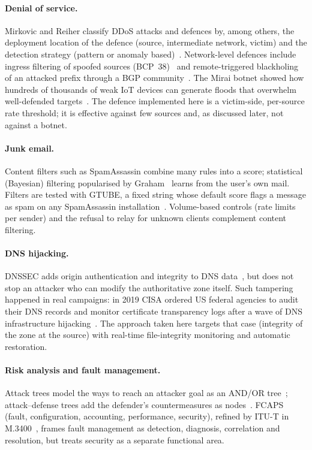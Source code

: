 \paragraph{Denial of service.}
Mirkovic and Reiher classify DDoS attacks and defences by, among others, the deployment location
of the defence (source, intermediate network, victim) and the detection strategy (pattern or
anomaly based)~\cite{mirkovic2004taxonomy}. Network-level defences include ingress filtering of
spoofed sources (BCP~38)~\cite{rfc2827} and remote-triggered blackholing of an attacked prefix
through a BGP community~\cite{rfc7999}. The Mirai botnet showed how hundreds of thousands of weak
IoT devices can generate floods that overwhelm well-defended targets~\cite{antonakakis2017mirai}.
The defence implemented here is a victim-side, per-source rate threshold; it is effective against few sources and,
as discussed later, not against a botnet.

\paragraph{Junk email.}
Content filters such as SpamAssassin combine many rules into a score; statistical (Bayesian)
filtering popularised by Graham~\cite{graham2002spam} learns from the user's own mail. Filters are
tested with GTUBE, a fixed string whose default score flags a message as spam on any
SpamAssassin installation~\cite{spamassassin_gtube}. Volume-based controls (rate limits per sender) and the refusal to
relay for unknown clients complement content filtering.

\paragraph{DNS hijacking.}
DNSSEC adds origin authentication and integrity to DNS data~\cite{rfc4033}, but does not stop an
attacker who can modify the authoritative zone itself. Such tampering happened in real campaigns:
in 2019 CISA ordered US federal agencies to audit their DNS records and monitor certificate
transparency logs after a wave of DNS infrastructure hijacking~\cite{cisa2019ed1901}. The approach taken here
targets that case (integrity of the zone at the source) with real-time file-integrity monitoring and
automatic restoration.

\paragraph{Risk analysis and fault management.}
Attack trees model the ways to reach an attacker goal as an AND/OR tree~\cite{schneier1999attacktrees};
attack--defense trees add the defender's countermeasures as nodes~\cite{kordy2010adtrees}. FCAPS
(fault, configuration, accounting, performance, security), refined by ITU-T in
M.3400~\cite{itu2000m3400}, frames fault management as detection, diagnosis, correlation and
resolution, but treats security as a separate functional area.
